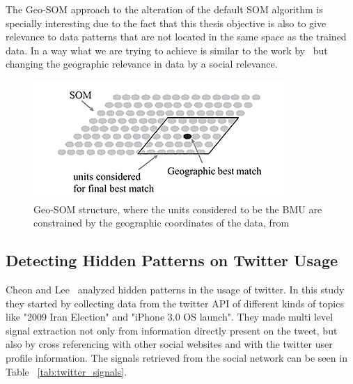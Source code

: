 The Geo-SOM approach to the alteration of the default \ac{SOM} algorithm is specially interesting due to the fact that this thesis objective is also to give relevance to data patterns that are not located in the same space as the trained data. In a way what we are trying to achieve is similar to the work by~\citet{Bacao2005} but changing the geographic relevance in data by a social relevance.
\begin{figure}[tb]
  \begin{center}
    \includegraphics[]{images/6_geo-som.png}
  \end{center}
  \caption{Geo-SOM structure, where the units considered to be the \ac{BMU} are constrained by the geographic coordinates of the data, from~\citet{Bacao2005}}
  \label{fig:geo_som}
\end{figure}

\subsection{Detecting Hidden Patterns on Twitter Usage} 
\label{sub:detecting_hidden_patterns_on_twitter_usage}
Cheon and Lee~\citep{Cheong2010} analyzed hidden patterns in the usage of twitter. In this study they started by collecting data from the twitter API of different kinds of topics like "2009 Iran Election" and "iPhone 3.0 OS launch". They made multi level signal extraction not only from information directly present on the tweet, but also by cross referencing with other social websites and with the twitter user profile information. The signals retrieved from the social network can be seen in Table ~\ref{tab:twitter_signals}.

